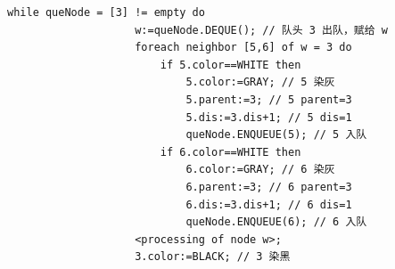 \documentclass{article}
\begin{document}
\begin{enumerate}
\begin{itemize}
    \begin{lstlisting}[style=algorithmPPT]
                while queNode = [3] != empty do
                    w:=queNode.DEQUE(); // 队头 3 出队，赋给 w
                    foreach neighbor [5,6] of w = 3 do
                        if 5.color==WHITE then
                            5.color:=GRAY; // 5 染灰
                            5.parent:=3; // 5 parent=3
                            5.dis:=3.dis+1; // 5 dis=1
                            queNode.ENQUEUE(5); // 5 入队
                        if 6.color==WHITE then
                            6.color:=GRAY; // 6 染灰
                            6.parent:=3; // 6 parent=3
                            6.dis:=3.dis+1; // 6 dis=1
                            queNode.ENQUEUE(6); // 6 入队
                    <processing of node w>;
                    3.color:=BLACK; // 3 染黑
                \end{lstlisting}
    \end{itemize}

    \begin{figure}[htbp]
        \begin{minipage}[b]{0.6\textwidth}    %
            \centering
\end{minipage}
\end{figure}
\end{enumerate}
\end{document}
